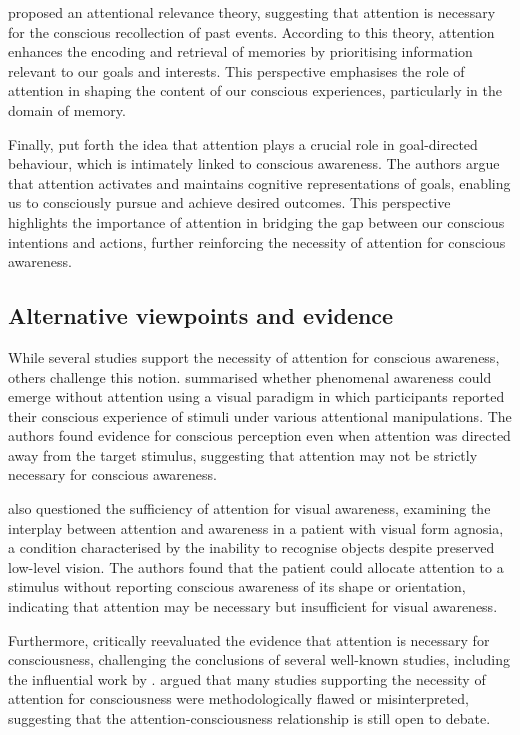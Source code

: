 \documentclass[10pt]{article}
\begin{document}
\begin{sloppypar}
  \cite{de_brigard_role_2012} proposed an attentional relevance theory, suggesting that attention is necessary for the conscious recollection of past events. According to this theory, attention enhances the encoding and retrieval of memories by prioritising information relevant to our goals and interests. This perspective emphasises the role of attention in shaping the content of our conscious experiences, particularly in the domain of memory.

  Finally, \cite{dijksterhuis_goals_2010} put forth the idea that attention plays a crucial role in goal-directed behaviour, which is intimately linked to conscious awareness. The authors argue that attention activates and maintains cognitive representations of goals, enabling us to consciously pursue and achieve desired outcomes. This perspective highlights the importance of attention in bridging the gap between our conscious intentions and actions, further reinforcing the necessity of attention for conscious awareness.

  \subsection{Alternative viewpoints and evidence}
  \label{sec:alternative}

  While several studies support the necessity of attention for conscious awareness, others challenge this notion. \cite{aru_phenomenal_2013} summarised whether phenomenal awareness could emerge without attention using a visual paradigm in which participants reported their conscious experience of stimuli under various attentional manipulations. The authors found evidence for conscious perception even when attention was directed away from the target stimulus, suggesting that attention may not be strictly necessary for conscious awareness.

  \cite{kentridge_attended_2008} also questioned the sufficiency of attention for visual awareness, examining the interplay between attention and awareness in a patient with visual form agnosia, a condition characterised by the inability to recognise objects despite preserved low-level vision. The authors found that the patient could allocate attention to a stimulus without reporting conscious awareness of its shape or orientation, indicating that attention may be necessary but insufficient for visual awareness.

  Furthermore, \cite{kozuch_gorillas_2018} critically reevaluated the evidence that attention is necessary for consciousness, challenging the conclusions of several well-known studies, including the influential work by \cite{cohen_attentional_2012}. \citeauthor*{kozuch_gorillas_2018} argued that many studies supporting the necessity of attention for consciousness were methodologically flawed or misinterpreted, suggesting that the attention-consciousness relationship is still open to debate.


\end{sloppypar}
\end{document}
